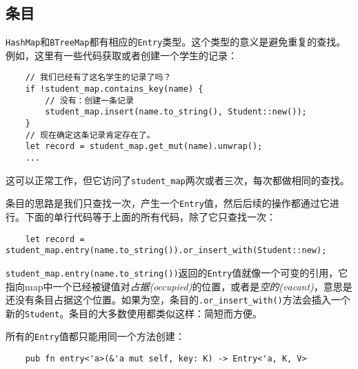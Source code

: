 \subsection{条目}\label{entry}
\texttt{HashMap}和\texttt{BTreeMap}都有相应的\texttt{Entry}类型。这个类型的意义是避免重复的查找。例如，这里有一些代码获取或者创建一个学生的记录：
\begin{verbatim}
    // 我们已经有了这名学生的记录了吗？
    if !student_map.contains_key(name) {
        // 没有：创建一条记录
        student_map.insert(name.to_string(), Student::new());
    }
    // 现在确定这条记录肯定存在了。
    let record = student_map.get_mut(name).unwrap();
    ...
\end{verbatim}

这可以正常工作，但它访问了\texttt{student\_map}两次或者三次，每次都做相同的查找。

条目的思路是我们只查找一次，产生一个\texttt{Entry}值，然后后续的操作都通过它进行。下面的单行代码等于上面的所有代码，除了它只查找一次：
\begin{verbatim}
    let record = student_map.entry(name.to_string()).or_insert_with(Student::new);
\end{verbatim}

\texttt{student\_map.entry(name.to\_string())}返回的\texttt{Entry}值就像一个可变的引用，它指向map中一个已经被键值对\emph{占据(occupied)}的位置，或者是\emph{空的(vacant)}，意思是还没有条目占据这个位置。如果为空，条目的\texttt{.or\_insert\_with()}方法会插入一个新的\texttt{Student}。条目的大多数使用都类似这样：简短而方便。

所有的\texttt{Entry}值都只能用同一个方法创建：

\begin{verbatim}
    pub fn entry<'a>(&'a mut self, key: K) -> Entry<'a, K, V>
\end{verbatim}



